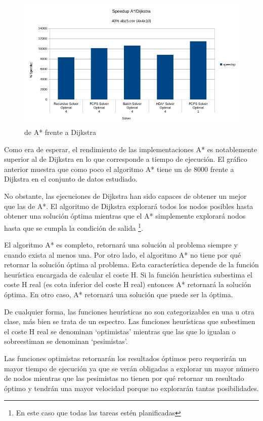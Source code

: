 \begin{figure}[h]
    \centering
    \includegraphics[width=\linewidth]{Media/Ch2/Speedup_Dijkstra.png}
    \caption{ de A* frente a Dijkstra}
    \label{fig:Speedup_Dijkstra}
\end{figure}

Como era de esperar, el rendimiento de las implementaciones A*
es notablemente superior al de Dijkstra en lo que corresponde
a tiempo de ejecución.
El gráfico anterior muestra que como poco el algoritmo A*
tiene un  de 8000 frente a Dijkstra
en el conjunto de datos estudiado.

No obstante, las ejecuciones de Dijkstra han sido capaces
de obtener un  mejor que las de A*.
El algoritmo de Dijkstra explorará todos los
nodos posibles hasta obtener una solución óptima
mientras que el A* simplemente explorará nodos
hasta que se cumpla la condición de salida
\footnote{En este caso que todas las tareas estén planificadas}.

El algoritmo A* es completo, retornará una solución al problema
siempre y cuando exista al menos una.
Por otro lado, el algoritmo A* no tiene por qué retornar la
solución óptima al problema.
Esta característica depende de la función heurística
encargada de calcular el coste H.
Si la función heurística subestima el coste H real
(es cota inferior del coste H real)
entonces A* retornará la solución óptima.
En otro caso, A* retornará una solución que puede
ser la óptima.

De cualquier forma, las funciones heurísticas no son
categorizables en una u otra clase,
más bien se trata de un espectro.
Las funciones heurísticas que subestimen
el coste H real se denominan `optimistas'
mientras que las que lo igualan o sobreestiman
se denominan `pesimistas'.
\begin{keynotebox}
Las funciones optimistas retornarán los resultados óptimos
pero requerirán un mayor tiempo de ejecución ya que
se verán obligadas a explorar un mayor número de nodos
mientras que las pesimistas no tienen por qué retornar un
resultado óptimo y tendrán una mayor velocidad porque
no explorarán tantas posibilidades.
\end{keynotebox}

